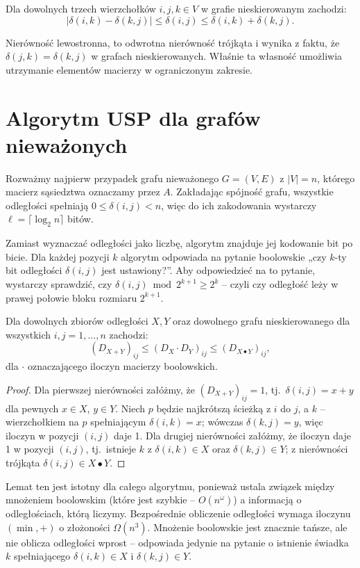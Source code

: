 \begin{lemat}
Dla dowolnych trzech wierzchołków $i, j, k \in V$ w grafie nieskierowanym zachodzi:
\[
|\delta(i,k) - \delta(k,j)| \leq \delta(i,j) \leq \delta(i,k) + \delta(k,j).
\]
\end{lemat}

Nierówność lewostronna, to odwrotna nierówność trójkąta i wynika z faktu, że $\delta(j,k) = \delta(k,j)$ w grafach nieskierowanych. Właśnie ta własność umożliwia utrzymanie elementów macierzy w ograniczonym zakresie.

\section{Algorytm USP dla grafów nieważonych}

Rozważmy najpierw przypadek grafu nieważonego $G = (V, E)$ z $|V| = n$, którego macierz sąsiedztwa oznaczamy przez $A$. Zakładając spójność grafu, wszystkie odległości spełniają $0 \leq \delta(i,j) < n$, więc do ich zakodowania wystarczy $\ell = \lceil \log_2 n \rceil$ bitów.

Zamiast wyznaczać odległości jako liczbę, algorytm znajduje jej kodowanie bit po bicie. Dla każdej pozycji $k$ algorytm odpowiada na pytanie boolowskie „czy $k$-ty bit odległości $\delta(i,j)$ jest ustawiony?''. Aby odpowiedzieć na to pytanie, wystarczy sprawdzić, czy $\delta(i,j) \bmod 2^{k+1} \geq 2^k$ -- czyli czy odległość leży w prawej połowie bloku rozmiaru $2^{k+1}$.

\begin{lemat}
Dla dowolnych zbiorów odległości $X, Y$ oraz dowolnego grafu nieskierowanego dla wszystkich $i, j = 1, \ldots, n$ zachodzi:
\[
(D_{X+Y})_{ij} \leq (D_X \cdot D_Y)_{ij} \leq (D_{X \bullet Y})_{ij},
\]
dla $\cdot$ oznaczającego iloczyn macierzy boolowskich.
\end{lemat}

\begin{proof}
Dla pierwszej nierówności załóżmy, że $(D_{X+Y})_{ij} = 1$, tj.\ $\delta(i,j) = x + y$ dla pewnych $x \in X$, $y \in Y$. Niech $p$ będzie najkrótszą ścieżką z $i$ do $j$, a $k$ -- wierzchołkiem na $p$ spełniającym $\delta(i,k) = x$; wówczas $\delta(k,j) = y$, więc iloczyn w pozycji $(i,j)$ daje 1. Dla drugiej nierówności załóżmy, że iloczyn daje 1 w pozycji $(i,j)$, tj.\ istnieje $k$ z $\delta(i,k) \in X$ oraz $\delta(k,j) \in Y$; z nierówności trójkąta $\delta(i,j) \in X \bullet Y$.
\end{proof}

Lemat ten jest istotny dla całego algorytmu, ponieważ ustala
związek między mnożeniem boolowskim (które jest szybkie -- $O(n^\omega)$)
a informacją o odległościach, którą liczymy. Bezpośrednie
obliczenie odległości wymaga iloczynu $(\min, +)$ o złożoności
$\Omega(n^3)$. Mnożenie boolowskie jest znacznie tańsze, ale nie
oblicza odległości wprost -- odpowiada jedynie na pytanie o istnienie
świadka $k$ spełniającego $\delta(i,k) \in X$ i $\delta(k,j) \in Y$.

